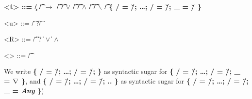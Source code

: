 \begin{grammar}
  \bfseries
  <t> ::= \c/ \| \t/ $\bm{\rightarrow}$ \t/
    \alt \t/ $\bm{\vee}$ \t/ \| \t/ $\bm{\wedge}$ \t/ \| \t/ $\bm{\backslash}$ \t/
    \alt [\meta{R}]
    \alt \{ \s/ = \u/; \ldots{}; \s/ = \u/; _ = \u/ \}

  <u> ::= \t/ \| ?\t/

  <R> ::= \t/ \|  \| ?
    \|  $\bm{\vee}$  \|  $\bm{\wedge}$ 

  <\τ> ::= \t/ %
\end{grammar}

We write \textbf{\{ \s/ = \u/; \ldots{}; \s/ = \u/; \}} as syntactic
sugar for \textbf{\{ \s/ = \u/; \ldots{}; \s/ = \u/; _ = $\nabla$ \}}, and
\textbf{\{ \s/ = \u/; \ldots{}; \s/ = \u/; .. \}} as syntactic sugar for
\textbf{\{ \s/ = \u/; \ldots{}; \s/ = \u/; _ = \textmd{\emph{Any}} \}})
